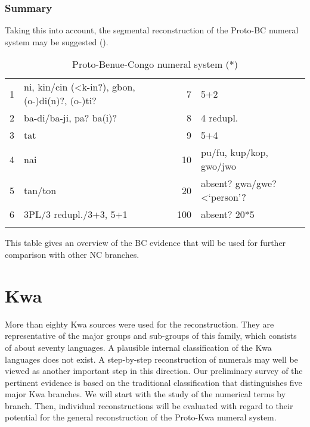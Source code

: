 \subsubsection{Summary}
Taking this into account, the segmental reconstruction of the Proto-BC numeral system may be suggested ().

\begin{table}
\caption{\label{tab:3:64}Proto-Benue-Congo numeral system (*)}


\begin{tabularx}{\textwidth}{lXrl}
\lsptoprule

{1} & ni, kin/cin (<k-in?), gbon,\newline (o-)di(n)?, (o-)ti? & {7} & 5+2\\
{2} & ba-di/ba-ji, pa? ba(i)? & {8} & 4 redupl.\\
{3} & tat & {9} & 5+4\\
{4} & nai & {10} & pu/fu, kup/kop, gwo/jwo\\
{5} & tan/ton & {20} & absent? gwa/gwe? <‘person’?\\
{6} & 3PL/3 redupl./3+3, 5+1 & {100} & absent? 20*5\\
\lspbottomrule
\end{tabularx}
\end{table}

This table gives an overview of the BC evidence that will be used for further comparison with other NC branches. 

\section{Kwa}%

More than eighty Kwa sources were used for the reconstruction. They are representative of the major groups and sub-groups of this family, which consists of about seventy languages. A plausible internal classification of the Kwa languages does not exist. A step-by-step reconstruction of numerals may well be viewed as another important step in this direction. Our preliminary survey of the pertinent evidence is based on the traditional classification that distinguishes five major Kwa branches. We will start with the study of the numerical terms by branch. Then, individual reconstructions will be evaluated with regard to their potential for the general reconstruction of the Proto-Kwa numeral system. 

